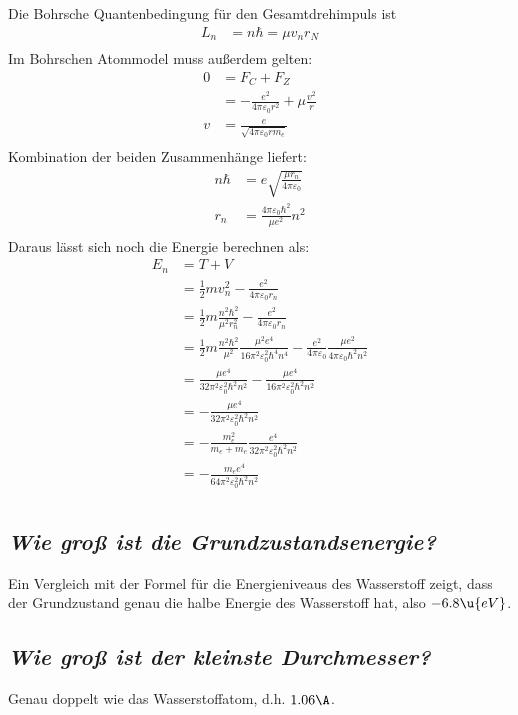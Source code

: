 \documentclass[ex,minted]{exercise_4.0}
\begin{document}
Die Bohrsche Quantenbedingung für den Gesamtdrehimpuls ist
\begin{align*}
    L_n &= n\hbar
    = \mu  v_n r_N\\
\end{align*}
Im Bohrschen Atommodel muss außerdem gelten:
\begin{align*}
    0 &= F_C + F_Z\\
    &= - \frac{e^2}{4\pi \varepsilon_0 r^2} + \mu  \frac{v^2}{r}\\
    v &= \frac{e}{\sqrt{4\pi \varepsilon_0 r m _e}}\\
\end{align*}
Kombination der beiden Zusammenhänge liefert: 
\begin{align*}
    n\hbar &= e \sqrt{\frac{\mu  r_n }{4\pi\varepsilon_0 }}\\
    r_n &= \frac{4\pi \varepsilon_0\hbar^2}{\mu  e^2} n^2\\
\end{align*}
Daraus lässt sich noch die Energie berechnen als:
\begin{align*}
    E_n &= T + V\\
    &= \frac12 mv_n^2 - \frac{e^2}{4\pi\varepsilon_0 r_n}\\
    &= \frac12 m \frac{n^2\hbar^2}{\mu ^2 r_n^2} - \frac{e^2}{4\pi\varepsilon_0 r_n}\\
    &= \frac12 m \frac{n^2\hbar^2}{\mu ^2}\frac{\mu ^2 e^4}{16\pi^2 \varepsilon_0^2\hbar^4 n^4} - \frac{e^2}{4\pi\varepsilon_0} \frac{\mu  e^2}{4\pi \varepsilon_0\hbar^2 n^2} \\
    &= \frac{\mu  e^4}{32\pi^2 \varepsilon_0^2\hbar^2 n^2} - \frac{\mu  e^4}{16\pi^2 \varepsilon_0^2\hbar^2 n^2} \\
    &= -\frac{\mu  e^4}{32\pi^2 \varepsilon_0^2\hbar^2 n^2}\\
    &= -\frac{m_e^2}{m_e + m_e}\frac{e^4}{32\pi^2 \varepsilon_0^2\hbar^2 n^2}\\
    &= -\frac{m_e e^4}{64\pi^2 \varepsilon_0^2\hbar^2 n^2}\\
\end{align*}

\subsection{\it Wie groß ist die Grundzustandsenergie?}

\dottedlinett

Ein Vergleich mit der Formel für die Energieniveaus des Wasserstoff zeigt, dass der Grundzustand genau die halbe Energie des Wasserstoff hat, also \(-6.8\u{eV}\).


\subsection{\it Wie groß ist der kleinste Durchmesser?}

\dottedlinett

Genau doppelt wie das Wasserstoffatom, d.h. \(1.06 \A\).
\end{document}
